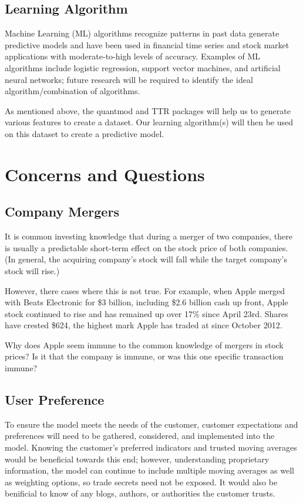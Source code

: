 \documentclass[11pt]{article}
\begin{document}
\subsection*{Learning Algorithm}\label{FP}
Machine Learning (ML) algorithms recognize patterns in past data generate predictive models and have been used in financial time series and stock market applications with moderate-to-high levels of accuracy.\textsuperscript{\cite{JSZ}\cite{MZ}\cite{ANHS}\cite{KK}\cite{BRS}} Examples of ML algorithms include logistic regression, support vector machines, and artificial neural networks; future research will be required to identify the ideal algorithm/combination of algorithms.

As mentioned above, the quantmod and TTR packages will help us to generate various features to create a dataset. Our learning algorithm(s) will then be used on this dataset to create a predictive model. 

\section*{\hspace{-.5cm} Concerns and Questions}\label{CQ}
\subsection*{Company Mergers}\label{CMerg}
It is common investing knowledge that during a merger of two companies, there is usually a predictable short-term effect on the stock price of both companies. (In general, the acquiring company's stock will fall while the target company's stock will rise.)\textsuperscript{\cite{INV}}

However, there cases where this is not true. For example, when Apple merged with Beats Electronic for \$3 billion, including \$2.6 billion cash up front, Apple stock continued to rise and has remained up over 17\% since April 23rd. Shares have crested \$624, the highest mark Apple has traded at since October 2012.\textsuperscript{\cite{FORBES}}

Why does Apple seem immune to the common knowledge of mergers in stock prices? Is it that the company is immune, or was this one specific transaction immune?

\subsection*{User Preference}\label{UP}
To ensure the model meets the needs of the customer, customer expectations and preferences will need to be gathered, considered, and implemented into the model. Knowing the customer's preferred indicators and trusted moving averages would be beneficial towards this end; however, understanding proprietary information, the model can continue to include multiple moving averages as well as weighting options, so trade secrets need not be exposed. It would also be benificial to know of any blogs, authors, or authorities the customer trusts.
\end{document}
